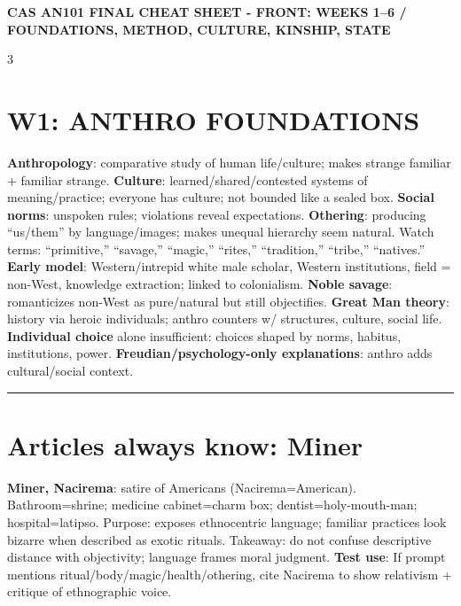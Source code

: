\documentclass[10pt,landscape]{article}
\newcommand{\kw}[1]{\textbf{#1}}
\newcommand{\sep}{\vspace{0.8pt}\hrule\vspace{0.8pt}}
\newcommand{\tinytext}{\fontsize{5.75}{5.95}\selectfont}
\begin{document}
\tinytext
\RaggedRight

\begin{center}\bfseries\fontsize{7}{7}\selectfont CAS AN101 FINAL CHEAT SHEET - FRONT: WEEKS 1--6 / FOUNDATIONS, METHOD, CULTURE, KINSHIP, STATE\end{center}\vspace{-4pt}
\begin{multicols}{3}

\section*{W1: ANTHRO FOUNDATIONS}
\kw{Anthropology}: comparative study of human life/culture; makes strange familiar + familiar strange. \kw{Culture}: learned/shared/contested systems of meaning/practice; everyone has culture; not bounded like a sealed box. \kw{Social norms}: unspoken rules; violations reveal expectations. \kw{Othering}: producing ``us/them'' by language/images; makes unequal hierarchy seem natural. Watch terms: ``primitive,'' ``savage,'' ``magic,'' ``rites,'' ``tradition,'' ``tribe,'' ``natives.'' \kw{Early model}: Western/intrepid white male scholar, Western institutions, field = non-West, knowledge extraction; linked to colonialism. \kw{Noble savage}: romanticizes non-West as pure/natural but still objectifies. \kw{Great Man theory}: history via heroic individuals; anthro counters w/ structures, culture, social life. \kw{Individual choice} alone insufficient: choices shaped by norms, habitus, institutions, power. \kw{Freudian/psychology-only explanations}: anthro adds cultural/social context.
\sep
\section*{Articles always know: Miner}
\kw{Miner, Nacirema}: satire of Americans (Nacirema=American). Bathroom=shrine; medicine cabinet=charm box; dentist=holy-mouth-man; hospital=latipso. Purpose: exposes ethnocentric language; familiar practices look bizarre when described as exotic rituals. Takeaway: do not confuse descriptive distance with objectivity; language frames moral judgment. \kw{Test use}: If prompt mentions ritual/body/magic/health/othering, cite Nacirema to show relativism + critique of ethnographic voice.


\end{multicols}
\end{document}
